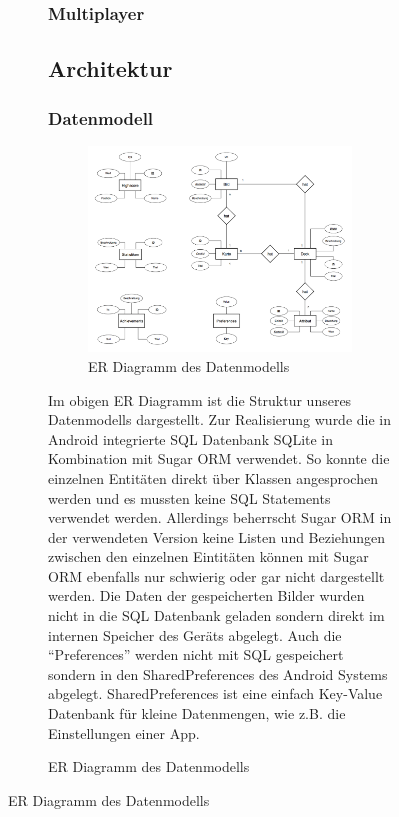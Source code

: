 \documentclass{scrartcl}
\begin{document}
\begin{figure}[!ht]
\begin{figure}[!ht]
\subsubsection{Multiplayer}
\subsection{Architektur}
\subsubsection{Datenmodell}

\begin{figure}[h]
  \centering
  \includegraphics[width=\textwidth]{img/map_er.png}
  \caption{ER Diagramm des Datenmodells}
\end{figure}

\noindent
Im obigen ER Diagramm ist die Struktur unseres Datenmodells dargestellt. Zur
Realisierung wurde die in Android integrierte SQL Datenbank SQLite in
Kombination mit Sugar ORM verwendet. So konnte die einzelnen Entitäten direkt
über Klassen angesprochen werden und es mussten keine SQL Statements verwendet
werden. Allerdings beherrscht Sugar ORM in der verwendeten Version keine Listen
und Beziehungen zwischen den einzelnen Eintitäten können mit Sugar ORM ebenfalls
nur schwierig oder gar nicht dargestellt werden. Die Daten der gespeicherten
Bilder wurden nicht in die SQL Datenbank geladen sondern direkt im internen
Speicher des Geräts abgelegt. Auch die \enquote{Preferences} werden nicht mit
SQL gespeichert sondern in den SharedPreferences des Android Systems abgelegt.
SharedPreferences ist eine einfach Key-Value Datenbank für kleine Datenmengen,
wie z.B. die Einstellungen einer App.


\end{figure}
\end{figure}
\end{document}
